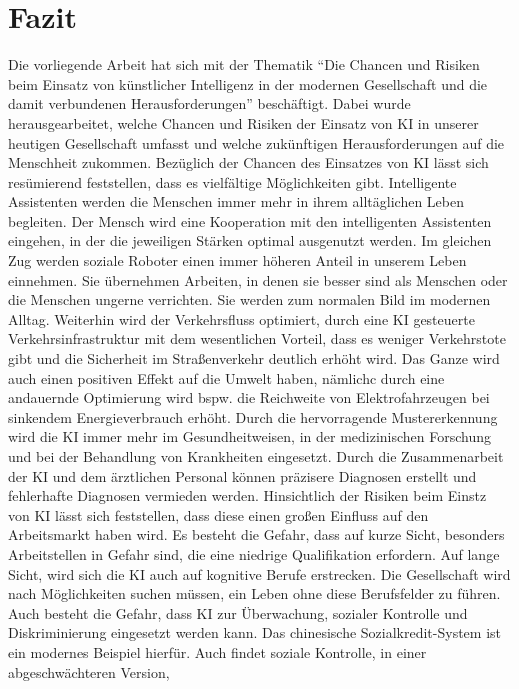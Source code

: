 \newpage
\section{Fazit}\label{Fazit}
Die vorliegende Arbeit hat sich mit der Thematik \enquote{Die Chancen und Risiken beim Einsatz von künstlicher Intelligenz in der modernen Gesellschaft und die damit verbundenen Herausforderungen}
beschäftigt. Dabei wurde herausgearbeitet, welche Chancen und Risiken der Einsatz von \ac{KI} in unserer heutigen Gesellschaft umfasst und welche zukünftigen Herausforderungen
auf die Menschheit zukommen.
Bezüglich der Chancen des Einsatzes von \ac{KI} lässt sich resümierend feststellen, dass es vielfältige Möglichkeiten gibt. Intelligente Assistenten werden die Menschen immer mehr in ihrem
alltäglichen Leben begleiten. Der Mensch wird eine Kooperation mit den intelligenten Assistenten eingehen, in der die jeweiligen Stärken optimal ausgenutzt werden. 
Im gleichen Zug werden soziale Roboter einen immer höheren Anteil in unserem Leben einnehmen. Sie übernehmen Arbeiten, in denen sie besser sind als Menschen oder die Menschen
ungerne verrichten. Sie werden zum normalen Bild im modernen Alltag.
Weiterhin wird der Verkehrsfluss optimiert, durch eine \ac{KI} gesteuerte Verkehrsinfrastruktur mit dem wesentlichen Vorteil, dass es weniger Verkehrstote gibt und die Sicherheit
im Straßenverkehr deutlich erhöht wird. Das Ganze wird auch einen positiven Effekt auf die Umwelt haben, nämlichc durch eine andauernde Optimierung wird bspw. die Reichweite von Elektrofahrzeugen bei sinkendem Energieverbrauch erhöht.
Durch die hervorragende Mustererkennung wird die \ac{KI} immer mehr im Gesundheitweisen, in der medizinischen Forschung und bei der Behandlung von Krankheiten eingesetzt. 
Durch die Zusammenarbeit der \ac{KI} und dem ärztlichen Personal können präzisere Diagnosen erstellt und fehlerhafte Diagnosen vermieden werden.
Hinsichtlich der Risiken beim Einstz von \ac{KI} lässt sich feststellen, dass diese einen großen Einfluss auf den Arbeitsmarkt haben wird. Es besteht die Gefahr, dass auf kurze Sicht,
besonders Arbeitstellen in Gefahr sind, die eine niedrige Qualifikation erfordern. Auf lange Sicht, wird sich die \ac{KI} auch auf kognitive Berufe erstrecken. Die Gesellschaft wird nach Möglichkeiten
suchen müssen, ein Leben ohne diese Berufsfelder zu führen.
Auch besteht die Gefahr, dass \ac{KI} zur Überwachung, sozialer Kontrolle und Diskriminierung eingesetzt werden kann. Das chinesische Sozialkredit-System ist ein modernes Beispiel hierfür. Auch findet soziale Kontrolle, in einer abgeschwächteren Version,
